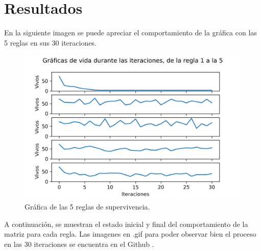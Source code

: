 \documentclass{article}
\begin{document}
\section{Resultados}

En la siguiente imagen se puede apreciar el comportamiento de la gráfica con las 5 reglas en sus 30 iteraciones.

\begin{figure}[H]
\centering
\includegraphics[width=140mm]{Grafica de vida.png}
\caption{\label{fig1}Gráfica de las 5 reglas de supervivencia.}
\end{figure}
\newpage
A continuación, se muestran el estado inicial y final del comportamiento de la matriz para cada regla. Las imagenes en .gif para poder observar bien el proceso en las 30 iteraciones se encuentra en el Github \cite{Denisse_Leyva}.
\end{document}
